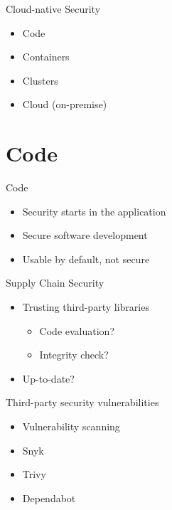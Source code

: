 \documentclass{dcpresentation}
\begin{document}
\begin{frame}{Cloud-native Security}
  \begin{itemize}
  \item Code
  \item Containers
  \item Clusters
  \item Cloud (on-premise)
  \end{itemize}
\end{frame}

\section{Code}

\begin{frame}{Code}
  \begin{itemize}
  \item Security starts in the application
  \item Secure software development
  \item Usable by default, not secure
  \end{itemize}
\end{frame}

\begin{frame}{Supply Chain Security}
  \begin{itemize}
  \item Trusting third-party libraries
    \begin{itemize}
    \item Code evaluation?
    \item Integrity check?
    \end{itemize}
  \item Up-to-date?
  \end{itemize}
\end{frame}

\begin{frame}{Third-party security vulnerabilities}
  \begin{itemize}
  \item Vulnerability scanning
  \item Snyk
  \item Trivy
  \item Dependabot
  \end{itemize}
\end{frame}
\end{document}
